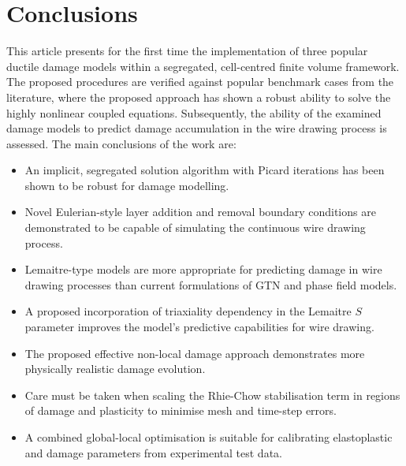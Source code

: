 \documentclass[sn-mathphys,Numbered]{sn-jnl}%
\begin{document}
%






\section{Conclusions} \label{sec:conclusion}
This article presents for the first time the implementation of three popular ductile damage models within a segregated, cell-centred finite volume framework.
The proposed procedures are verified against popular benchmark cases from the literature, where the proposed approach has shown a robust ability to solve the highly nonlinear coupled equations.
Subsequently, the ability of the examined damage models to predict damage accumulation in the wire drawing process is assessed.
The main conclusions of the work are:
\begin{itemize}
	\item An implicit, segregated solution algorithm with Picard iterations has been shown to be robust for damage modelling.
	\item Novel Eulerian-style layer addition and removal boundary conditions are demonstrated to be capable of simulating the continuous wire drawing process.
	\item Lemaitre-type models are more appropriate for predicting damage in wire drawing processes than current formulations of GTN and phase field models.
	\item A proposed incorporation of triaxiality dependency in the Lemaitre $S$ parameter improves the model's predictive capabilities for wire drawing.
	\item The proposed effective non-local damage approach demonstrates more physically realistic damage evolution.
	\item Care must be taken when scaling the Rhie-Chow stabilisation term in regions of damage and plasticity to minimise mesh and time-step errors.
	\item A combined global-local optimisation is suitable for calibrating elastoplastic and damage parameters from experimental test data.
\end{itemize}
\end{document}
